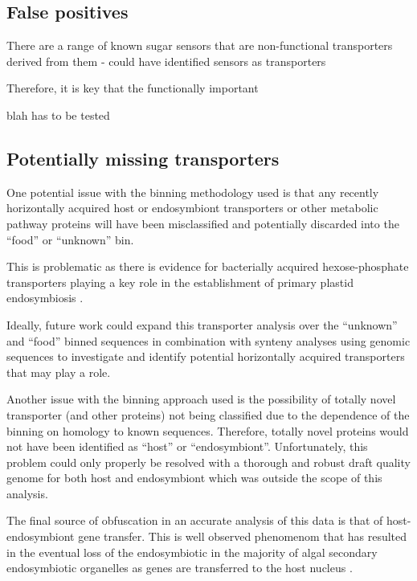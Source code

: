 \subsection{False positives}

There are a range of known sugar sensors that are non-functional
transporters derived from them - could have identified sensors as 
transporters \citep{Lalonde1999,Bianchi2010}

Therefore, it is key that the functionally important 

blah has to be tested

\subsection{Potentially missing transporters}

One potential issue with the binning methodology used is
that any recently horizontally acquired host or endosymbiont 
transporters or other metabolic pathway proteins will have been misclassified
and potentially discarded into the ``food'' or ``unknown'' bin.

This is problematic as there is evidence for bacterially acquired 
hexose-phosphate transporters playing a key role in the 
establishment of primary plastid endosymbiosis \citep{Price2012,Karkar2015a}.

Ideally, future work could expand this transporter analysis over the 
``unknown'' and ``food'' binned sequences in combination with synteny
analyses using genomic sequences to investigate and identify
potential horizontally acquired transporters that may play a role.

Another issue with the binning approach used is the possibility
of totally novel transporter (and other proteins) not being classified
due to the dependence of the binning on homology to known sequences.
Therefore, totally novel proteins would not have been identified as 
``host'' or ``endosymbiont''.  Unfortunately, this problem 
could only properly be resolved with a thorough and robust 
draft quality genome for both host and endosymbiont which was outside
the scope of this analysis. 

The final source of obfuscation in an accurate analysis of this data
is that of host-endosymbiont gene transfer.  
This is well observed phenomenom that has resulted in the eventual loss
of the endosymbiotic in the majority of algal secondary endosymbiotic organelles
as genes are transferred to the host nucleus
\citep{Keeling2008a,Archibald2005,Keeling2004}.


